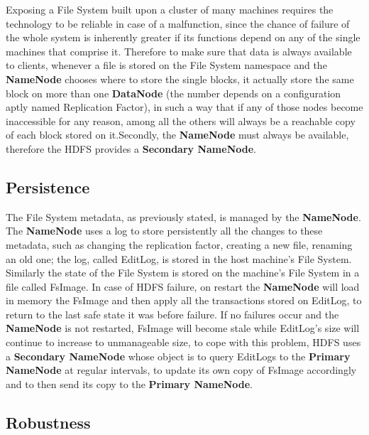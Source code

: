 Exposing a File System built upon a cluster of many machines requires the technology to be reliable in case of a malfunction, since the chance of failure of the whole system is inherently greater if its functions depend on any of the single machines that comprise it. \newline Therefore to make sure that data is always available to clients, whenever a file is stored on the File System namespace and the \textbf{NameNode} chooses where to store the single blocks, it actually store the same block on more than one \textbf{DataNode} (the number depends on a configuration aptly named Replication Factor), in such a way that if any of those nodes become inaccessible for any reason, among all the others will always be a reachable copy of each block stored on it.\newline Secondly, the \textbf{NameNode} must always be available, therefore the HDFS provides a \textbf{Secondary NameNode}.

\subsection{Persistence}

The File System metadata, as previously stated, is managed by the \textbf{NameNode}. The \textbf{NameNode} uses a log to store persistently all the changes to these metadata, such as changing the replication factor, creating a new file, renaming an old one; the log, called EditLog, is stored in the host machine's File System. Similarly the state of the File System is stored on the machine's File System in a file called FsImage.\newline
In case of HDFS failure, on restart the \textbf{NameNode} will load in memory the FsImage and then apply all the transactions stored on EditLog, to return to the last safe state it was before failure.
\newline
If no failures occur and the \textbf{NameNode} is not restarted, FsImage will become stale while EditLog's size will continue to increase to unmanageable size, to cope with this problem, HDFS uses a \textbf{Secondary NameNode} whose object is to query EditLogs to the \textbf{Primary NameNode} at regular intervals, to update its own copy of FsImage accordingly and to then send its copy to the \textbf{Primary NameNode}.

\subsection{Robustness}

